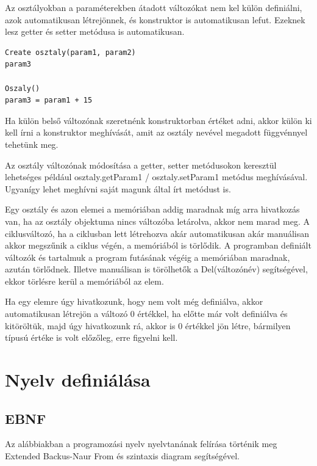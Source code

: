 Az osztályokban a paraméterekben átadott változókat nem kel külön definiálni, azok automatikusan létrejönnek, és konstruktor is automatikusan lefut. Ezeknek lesz getter és setter metódusa is automatikusan.

\begin{verbatim}
Create osztaly(param1, param2)
param3

Oszaly()
param3 = param1 + 15
\end{verbatim}

Ha külön belső változónak szeretnénk konstruktorban értéket adni, akkor külön ki kell írni a konstruktor meghívását, amit az osztály nevével megadott függvénnyel tehetünk meg.

Az osztály változónak módosítása a getter, setter metódusokon keresztül lehetséges például osztaly.getParam1 / osztaly.setParam1 metódus meghívásával. Ugyanígy lehet meghívni saját magunk által írt metódust is.

Egy osztály és azon elemei a memóriában addig maradnak míg arra hivatkozás van, ha az osztály objektuma nincs változóba letárolva, akkor nem marad meg. A ciklusváltozó, ha a ciklusban lett létrehozva akár automatikusan akár manuálisan akkor megszűnik a ciklus végén, a memóriából is törlődik. A programban definiált változók és tartalmuk a program futásának végéig a memóriában maradnak, azután törlődnek. Illetve manuálisan is törölhetők a Del(változónév) segítségével, ekkor törlésre kerül a memóriából az elem.

Ha egy elemre úgy hivatkozunk, hogy nem volt még definiálva, akkor automatikusan létrejön a változó 0 értékkel, ha előtte már volt definiálva és kitöröltük, majd úgy hivatkozunk rá, akkor is 0 értékkel jön létre, bármilyen típusú értéke is volt előzőleg, erre figyelni kell.




\section{Nyelv definiálása}

\subsection{EBNF}

Az alábbiakban a programozási nyelv nyelvtanának felírása történik meg Extended Backus-Naur From és szintaxis diagram segítségével.

